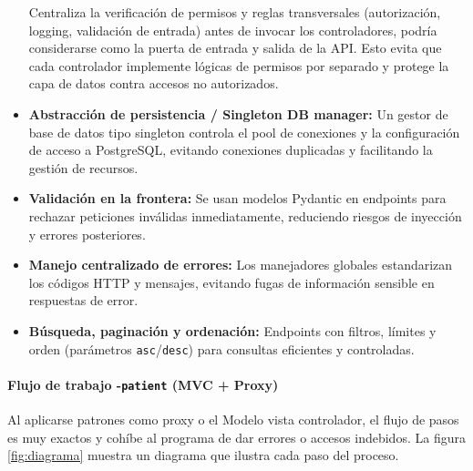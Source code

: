 \documentclass[12pt, a4paper]{article}
\begin{document}
\begin{itemize}
	Centraliza la verificación de permisos y reglas transversales (autorización, logging, validación de entrada) antes de invocar los controladores, podría considerarse como la puerta de entrada y salida de la API. Esto evita que cada controlador implemente lógicas de permisos por separado y protege la capa de datos contra accesos no autorizados.
	\item \textbf{Abstracción de persistencia / Singleton DB manager:}  
	Un gestor de base de datos tipo singleton controla el pool de conexiones y la configuración de acceso a PostgreSQL, evitando conexiones duplicadas y facilitando la gestión de recursos.
	\item \textbf{Validación en la frontera:}  
	Se usan modelos Pydantic en endpoints para rechazar peticiones inválidas inmediatamente, reduciendo riesgos de inyección y errores posteriores.
	\item \textbf{Manejo centralizado de errores:}  
	Los manejadores globales estandarizan los códigos HTTP y mensajes, evitando fugas de información sensible en respuestas de error.
	\item \textbf{Búsqueda, paginación y ordenación:}  
	Endpoints con filtros, límites y orden (parámetros \texttt{asc}/\texttt{desc}) para consultas eficientes y controladas.
\end{itemize}

\paragraph{Flujo de trabajo -\texttt{patient} (MVC + Proxy)}

Al aplicarse patrones como proxy o el Modelo vista controlador, el flujo de pasos es muy exactos y cohíbe al programa de dar errores o accesos indebidos. La figura \ref{fig:diagrama} muestra un diagrama que ilustra cada paso del proceso.
\end{document}
